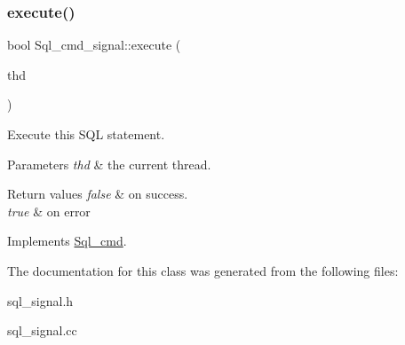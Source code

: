 \subsubsection{\texorpdfstring{execute()}{execute()}}
{\footnotesize\ttfamily bool Sql\+\_\+cmd\+\_\+signal\+::execute (\begin{DoxyParamCaption}\item[{T\+HD $\ast$}]{thd }\end{DoxyParamCaption})\hspace{0.3cm}{\ttfamily [virtual]}}

Execute this S\+QL statement. 
\begin{DoxyParams}{Parameters}
{\em thd} & the current thread. \\
\hline
\end{DoxyParams}

\begin{DoxyRetVals}{Return values}
{\em false} & on success. \\
\hline
{\em true} & on error \\
\hline
\end{DoxyRetVals}


Implements \mbox{\hyperlink{classSql__cmd_a213367b79b551296fbb7790f2a3732fb}{Sql\+\_\+cmd}}.



The documentation for this class was generated from the following files\+:\begin{DoxyCompactItemize}
\item 
sql\+\_\+signal.\+h\item 
sql\+\_\+signal.\+cc\end{DoxyCompactItemize}
